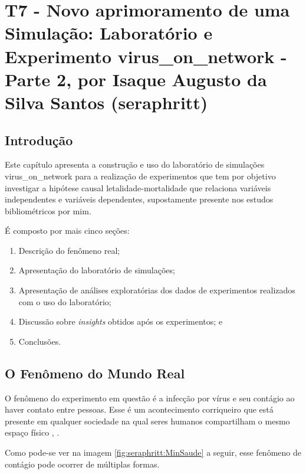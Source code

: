 \chapter{T7 - Novo aprimoramento de uma Simulação: Laboratório e Experimento virus\_on\_network - Parte 2, por Isaque Augusto da Silva Santos (seraphritt)\label{desenho:experimento:jhcf}}

\section{Introdução}

Este capítulo apresenta a construção e uso do laboratório de simulações virus\_on\_network para a realização de experimentos que tem por objetivo investigar a hipótese causal letalidade-mortalidade que relaciona variáveis independentes e variáveis dependentes, supostamente presente nos estudos bibliométricos por mim.

É composto por mais cinco seções: 
\begin{enumerate}
    \item Descrição do fenômeno real;
    \item Apresentação do laboratório de simulações;
    \item Apresentação de análises exploratórias dos dados de experimentos realizados com o uso do laboratório;
    \item Discussão sobre \textit{insights} obtidos após os experimentos; e
    \item Conclusões.
\end{enumerate}

\section{O Fenômeno do Mundo Real}

O fenômeno do experimento em questão é a infecção por vírus e seu contágio ao haver contato entre pessoas. Esse é um acontecimento corriqueiro que está presente em qualquer sociedade na qual seres humanos compartilham o mesmo espaço físico \cite{delikhoon_modes_2021-1}, \cite{leung_transmissibility_2021}. 

Como pode-se ver na imagem \ref{fig:seraphritt:MinSaude} a seguir, esse fenômeno de contágio pode ocorrer de múltiplas formas.

